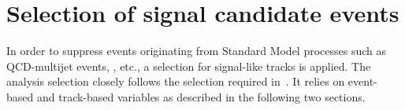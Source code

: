\section{Selection of signal candidate events}
\label{sec:AnalysisSelection}

In order to suppress events originating from Standard Model processes such as QCD-multijet events, \WJets, etc., a selection for signal-like tracks is applied.
The analysis selection closely follows the selection required in~\cite{bib:CMS:DT_Thesis,bib:CMS:DT_8TeV_AN}.
It relies on event-based and track-based variables as described in the following two sections.


